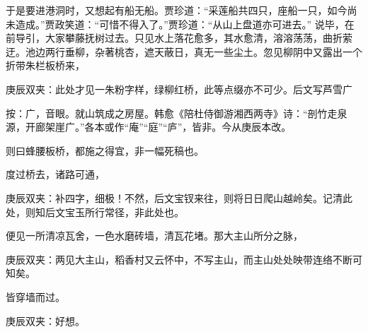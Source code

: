 \begin{parag}
    于是要进港洞时，又想起有船无船。贾珍道：“采莲船共四只，座船一只，如今尚未造成。”贾政笑道：“可惜不得入了。”贾珍道：“从山上盘道亦可进去。” 说毕，在前导引，大家攀藤抚树过去。只见水上落花愈多，其水愈清，溶溶荡荡，曲折萦迂。池边两行垂柳，杂著桃杏，遮天蔽日，真无一些尘土。忽见柳阴中又露出一个折带朱栏板桥来，\begin{note}庚辰双夹：此处才见一朱粉字样，绿柳红桥，此等点缀亦不可少。后文写芦雪广\end{note}\begin{subnote}按：广，音眼。就山筑成之房屋。韩愈《陪杜侍御游湘西两寺》诗：“剖竹走泉源，开廊架崖广。”各本或作“庵”“庭”“庐”，皆非。今从庚辰本改。\end{subnote}\begin{note}则曰蜂腰板桥，都施之得宜，非一幅死稿也。\end{note}度过桥去，诸路可通，\begin{note}庚辰双夹：补四字，细极！不然，后文宝钗来往，则将日日爬山越岭矣。记清此处，则知后文宝玉所行常径，非此处也。\end{note}便见一所清凉瓦舍，一色水磨砖墙，清瓦花堵。那大主山所分之脉，\begin{note}庚辰双夹：两见大主山，稻香村又云怀中，不写主山，而主山处处映带连络不断可知矣。\end{note}皆穿墙而过。\begin{note}庚辰双夹：好想。\end{note}
\end{parag}


